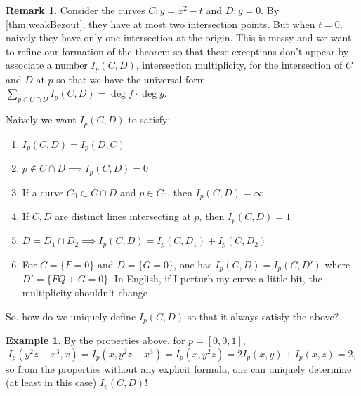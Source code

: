 \documentclass{article}
\theoremstyle{definition}
\newtheorem{example}[defn]{Example}
\newtheorem{remark}[defn]{Remark}
\begin{document}
\begin{remark}
Consider the curves $C:y=x^2-t$ and $D:y=0$. By \ref{thm:weakBezout}, they have at most two intersection points. But when $t=0$, naively they have only one intersection at the origin. This is messy and we want to refine our formation of the theorem so that these exceptions don't appear by associate a number $I_p(C,D)$, intersection multiplicity, for the intersection of $C$ and $D$ at $p$ so that we have the universal form $\sum_{p\in C\cap D}I_p(C,D)=\deg f\cdot \deg g$.

Naively we want $I_p(C,D)$ to satisfy:
\begin{enumerate}
\item $I_p(C,D)=I_p(D,C)$
\item $p\notin C\cap D\implies I_p(C,D)=0$
\item If a curve $C_0\subset C\cap D$ and $p\in C_0$, then $I_p(C,D)=\infty$
\item If $C,D$ are distinct lines intersecting at $p$, then $I_p(C,D)=1$
\item $D=D_1\cap D_2\implies I_p(C,D)=I_p(C,D_1)+I_p(C,D_2)$
\item For $C=\{F=0\}$ and $D=\{G=0\}$, one has $I_p(C,D)=I_p(C,D')$ where $D'=\{FQ+G=0\}$. In English, if I perturb my curve a little bit, the multiplicity shouldn't change
\end{enumerate}
So, how do we uniquely define $I_p(C,D)$ so that it always satisfy the above?
\end{remark}

\begin{example}
By the properties above, for $p=[0,0,1]$,
\[
I_p(y^2z-x^3,x)=I_p(x,y^2z-x^3)=I_p(x,y^2z)=2I_p(x,y)+I_p(x,z)=2,
\]
so from the properties without any explicit formula, one can uniquely determine (at least in this case) $I_p(C,D)$!
\end{example}
\end{document}
